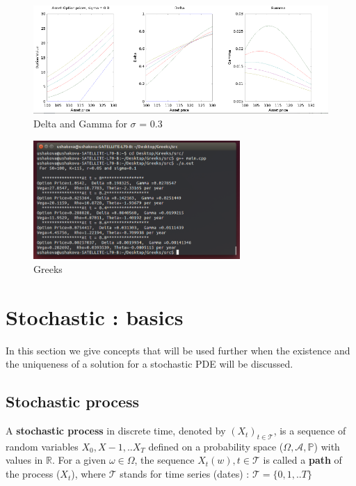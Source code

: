 \documentclass[a4paper]{report}
\begin{document}
\begin{itemize}
\begin{figure}[H]
    \centering
    \includegraphics[width=\textwidth]{octave2.png}
    \caption{Delta and Gamma for $\sigma$ = 0.3}
\end{figure}

\begin{figure}[H]
    \left
    \includegraphics[width=0.7\textwidth]{gpp.png}
    \caption{ Greeks }
\end{figure}


\chapter{Stochastic : basics}
In this section we give concepts that will be used further when the existence and the uniqueness of a solution for a stochastic PDE will be discussed.

\section{Stochastic process}


A \textbf{stochastic process} in discrete time, denoted by $(X_t)_{t \in \mathcal{T}}$, is a sequence of random variables $X_0,X-1,..X_T$ defined on a probability space ($\Omega, \mathcal{A}, \mathbb{P}$) with values in $\mathbb{R}$. For a given $\omega \in \Omega$, the sequence $X_t(w), t\in \mathcal{T}$ is called a \textbf{path} of the process ($X_t$), where $\mathcal{T}$ stands for time series (dates) : $\mathcal{T}=\{0,1,..T\}$
\\


\end{itemize}
\end{document}
